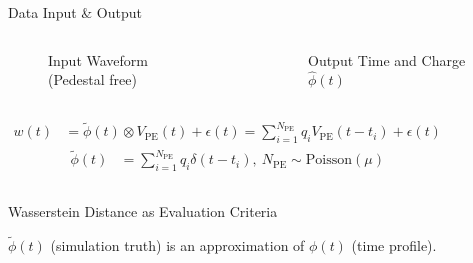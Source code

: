\documentclass[final]{beamer}
\newlength{\colwidth}
\begin{document}
\begin{frame}[t]
\begin{columns}[t]
\begin{column}{\colwidth}
\begin{block}{Data Input \& Output}
    \begin{columns}
    \begin{figure}
        \centering
        \resizebox{0.9\textwidth}{!}{}
        \caption{Input Waveform (Pedestal free)}
    \end{figure}
    \begin{figure}
        \centering
        \resizebox{0.9\textwidth}{!}{}
        \caption{Output Time and Charge $\hat\phi(t)$}
    \end{figure}
    \end{columns}
    \begin{columns}
    \begin{align*}
      w(t) &= \tilde{\phi}(t) \otimes V_\mathrm{PE}(t) + \epsilon(t) = \sum_{i=1}^{N_\mathrm{PE}} q_i V_\mathrm{PE}(t-t_i) + \epsilon(t)
    \end{align*}
    \begin{align*}
      \tilde{\phi}(t) &= \sum_{i=1}^{N_{\mathrm{PE}}} q_i \delta(t-t_i), \ N_{\mathrm{PE}}\sim \mathrm{Poisson}(\mu)
    \end{align*}
    \end{columns}

  \end{block}

  \begin{block}{Wasserstein Distance\cite{villani_2009} as Evaluation Criteria}

    $\tilde{\phi}(t)$ (simulation truth) is an approximation of $\phi(t)$ (time profile). 


\end{block}
\end{column}
\end{columns}
\end{frame}
\end{document}
